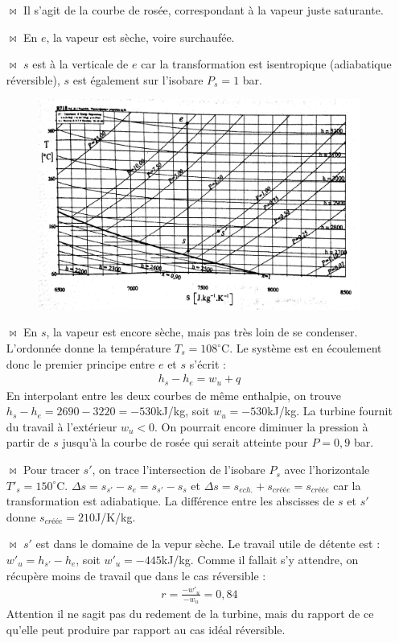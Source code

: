 \documentclass{report}
\begin{document}
\begin{itemize}

	\item[$\bowtie$] Il s'agit de la courbe de rosée, correspondant à la vapeur juste saturante.
	
	\item[$\bowtie$] En $e$, la vapeur est sèche, voire surchaufée.
	
		\item[$\bowtie$]  $s$ est à la verticale de $e$ car la transformation est isentropique (adiabatique réversible), $s$ est également sur l'isobare $P_s=1$ bar.
		
		\begin{figure}[!h]
\centering
\includegraphics[width=0.8\linewidth]{diagramme_TS2.png}
\end{figure}
		
		\item[$\bowtie$] En $s$, la vapeur est encore sèche, mais pas très loin de se condenser. L'ordonnée donne la température $T_s=108^\circ$C. Le système est en écoulement donc le premier principe entre $e$ et $s$ s'écrit : 
		\begin{align*}
			h_s-h_e=w_u+q
		\end{align*}
		En interpolant entre les deux courbes de même enthalpie, on trouve $h_s-h_e=2690-3220=-530$kJ/kg, soit $w_u=-530$kJ/kg. La turbine fournit du travail à l'extérieur $w_u<0$. On pourrait encore diminuer la pression à partir de $s$ jusqu'à la courbe de rosée qui serait atteinte pour $P=0,9$ bar.

	\item[$\bowtie$] Pour tracer $s'$, on trace l'intersection de l'isobare $P_s$ avec l'horizontale $T'_s=150^\circ$C. $\Delta s= s_{s'}-s_e= s_{s'}-s_s$ et $\Delta s =s_{ech.} +  s_{créée}=s_{créée}$ car la transformation est adiabatique. La différence entre les abscisses de $s$ et $s'$ donne $s_{créée}=210$J/K/kg. 

	
	\item[$\bowtie$] $s'$ est dans le domaine de la vepur sèche. Le travail utile de détente est : $w'_u=h_{s'}-h_e$, soit $w'_u=-445$kJ/kg. Comme il fallait s'y attendre, on récupère moins de travail que dans le cas réversible : 
	\begin{align*}
		r=\frac{-w'_u}{-w_u}=0,84
	\end{align*}
	Attention il ne sagit pas du redement de la turbine, mais du rapport de ce qu'elle peut produire par rapport au cas idéal réversible.

\end{itemize}
\end{document}
